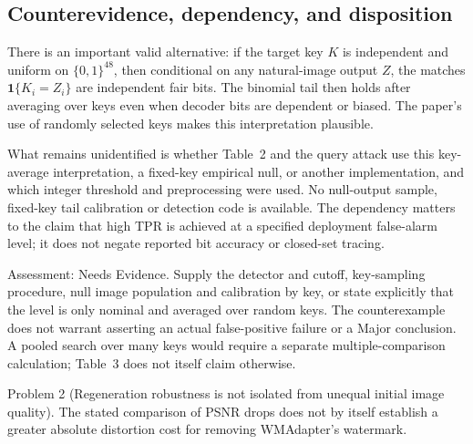 \documentclass[10pt]{article}
\begin{document}
\subsection*{Counterevidence, dependency, and disposition}
There is an important valid alternative: if the target key \(K\) is independent and uniform on \(\{0,1\}^{48}\), then conditional on any natural-image output \(Z\), the matches \(\mathbf1\{K_i=Z_i\}\) are independent fair bits. The binomial tail then holds after averaging over keys even when decoder bits are dependent or biased. The paper’s use of randomly selected keys makes this interpretation plausible.\par
What remains unidentified is whether Table 2 and the query attack use this key-average interpretation, a fixed-key empirical null, or another implementation, and which integer threshold and preprocessing were used. No null-output sample, fixed-key tail calibration or detection code is available. The dependency matters to the claim that high TPR is achieved at a specified deployment false-alarm level; it does not negate reported bit accuracy or closed-set tracing.\par
Assessment: Needs Evidence. Supply the detector and cutoff, key-sampling procedure, null image population and calibration by key, or state explicitly that the level is only nominal and averaged over random keys. The counterexample does not warrant asserting an actual false-positive failure or a Major conclusion. A pooled search over many keys would require a separate multiple-comparison calculation; Table 3 does not itself claim otherwise.\par
Problem 2 (Regeneration robustness is not isolated from unequal initial image quality).  The stated comparison of PSNR drops does not by itself establish a greater absolute distortion cost for removing WMAdapter’s watermark.\par
\end{document}
